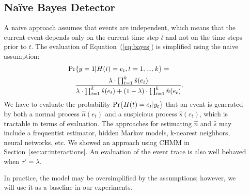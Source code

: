 



\subsection{Na{\"i}ve Bayes Detector}
\noindent
A naive approach assumes that events are independent, 
which means that the current event depends only on the current time step $t$ and not on the time steps prior to $t$. The evaluation of Equation~(\ref{eq:bayes}) is simplified using the naive assumption:
\begin{eqnarray}
\label{eq:naive-bayes}
    \lefteqn {\Prob\{y=1|H(t)=e_t, t=1,...,k\} = }\nonumber \\
	&&\frac{\lambda \cdot \prod_{t=1}^{k}\hat{s}(e_t)}{\lambda \cdot \prod_{i=1}^{k}\hat{s}(e_t) + (1-\lambda) \cdot \prod_{i=1}^{k}\hat{n}(e_t)}. 
\end{eqnarray}
We have to evaluate the probability $\text{Pr}\{H(t)=e_t|y_t\}$ that an event is generated by both a normal process $\hat{n}(e_t)$ and a suspicious process $\hat{s}(e_t)$, which is tractable in terms of evaluation. The approaches for estimating $\hat{n}$ and $\hat{s}$ may include a frequentist estimator, hidden Markov models, k-nearest neighbors, neural networks, etc. We showed an approach using CHMM in Section~\ref{sec:ar:interactions}. An evaluation of the event trace is also well behaved when $\tau'=\lambda$.

In practice, the model may be oversimplified by the assumptions; however, we will use it as a baseline in our experiments.


